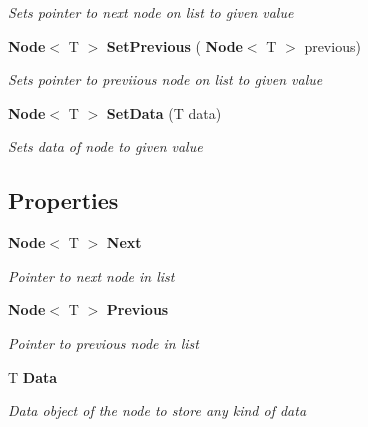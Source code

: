 \begin{DoxyCompactItemize}
\begin{DoxyCompactList}\small\item\em Sets pointer to next node on list to given value\end{DoxyCompactList}\item 
\textbf{ Node}$<$ T $>$ \textbf{ Set\+Previous} (\textbf{ Node}$<$ T $>$ previous)
\begin{DoxyCompactList}\small\item\em Sets pointer to previious node on list to given value\end{DoxyCompactList}\item 
\textbf{ Node}$<$ T $>$ \textbf{ Set\+Data} (T data)
\begin{DoxyCompactList}\small\item\em Sets data of node to given value\end{DoxyCompactList}\end{DoxyCompactItemize}
\subsection*{Properties}
\begin{DoxyCompactItemize}
\item 
\mbox{\label{class_d_s_project_universal_1_1_util_1_1_node_a0fa5e552e505eafe3b17b8624929560c}} 
\textbf{ Node}$<$ T $>$ \textbf{ Next}\hspace{0.3cm}{\ttfamily  [get]}
\begin{DoxyCompactList}\small\item\em Pointer to next node in list\end{DoxyCompactList}\item 
\mbox{\label{class_d_s_project_universal_1_1_util_1_1_node_aa77750e081a6e6f6ec16f3628cd3610f}} 
\textbf{ Node}$<$ T $>$ \textbf{ Previous}\hspace{0.3cm}{\ttfamily  [get]}
\begin{DoxyCompactList}\small\item\em Pointer to previous node in list\end{DoxyCompactList}\item 
\mbox{\label{class_d_s_project_universal_1_1_util_1_1_node_ab0dbcdfe94ab49f8e5e4b8a4c0be424e}} 
T \textbf{ Data}\hspace{0.3cm}{\ttfamily  [get]}
\begin{DoxyCompactList}\small\item\em Data object of the node to store any kind of data\end{DoxyCompactList}\end{DoxyCompactItemize}


